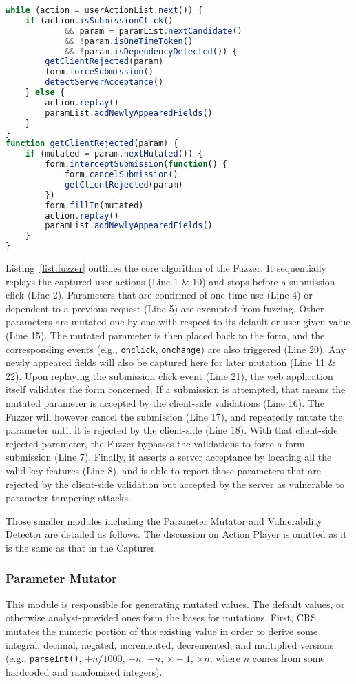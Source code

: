 \documentclass[letter]{sig-alternate-2013}
\begin{document}
\begin{lstlisting}[float=left,xleftmargin=2em,language=JavaScript,label=list:fuzzer,caption=The core algorithm of the Fuzzer]
while (action = userActionList.next()) {
	if (action.isSubmissionClick() 
			&& param = paramList.nextCandidate() 
			&& !param.isOneTimeToken() 
			&& !param.isDependencyDetected()) {
		getClientRejected(param)
		form.forceSubmission()
		detectServerAcceptance()
	} else {
		action.replay()
		paramList.addNewlyAppearedFields()
	}
}
function getClientRejected(param) {
	if (mutated = param.nextMutated()) {
		form.interceptSubmission(function() {
			form.cancelSubmission()
			getClientRejected(param)
		})
		form.fillIn(mutated)
		action.replay()
		paramList.addNewlyAppearedFields()
	}
}
\end{lstlisting}

Listing~\ref{list:fuzzer} outlines the core algorithm of the Fuzzer. It sequentially replays the captured user actions (Line 1 \& 10) and stops before a submission click (Line 2). Parameters that are confirmed of one-time use (Line 4) or dependent to a previous request (Line 5) are exempted from fuzzing. Other parameters are mutated one by one with respect to its default or user-given value (Line 15). The mutated parameter is then placed back to the form, and the corresponding events (e.g., \verb"onclick", \verb"onchange") are also triggered (Line 20). Any newly appeared fields will also be captured here for later mutation (Line 11 \& 22). Upon replaying the submission click event (Line 21), the web application itself validates the form concerned. If a submission is attempted, that means the mutated parameter is accepted by the client-side validations (Line 16). The Fuzzer will however cancel the submission (Line 17), and repeatedly mutate the parameter until it is rejected by the client-side (Line 18). With that client-side rejected parameter, the Fuzzer bypasses the validations to force a form submission (Line 7). Finally, it asserts a server acceptance by locating all the valid key features (Line 8), and is able to report those parameters that are rejected by the client-side validation but accepted by the server as vulnerable to parameter tampering attacks.

Those smaller modules including the Parameter Mutator and Vulnerability Detector are detailed as follows. The discussion on Action Player is omitted as it is the same as that in the Capturer.

\subsubsection{Parameter Mutator}
This module is responsible for generating mutated values. The default values, or otherwise analyst-provided ones form the bases for mutations. First, CRS mutates the numeric portion of this existing value in order to derive some integral, decimal, negated, incremented, decremented, and multiplied versions (e.g., \verb"parseInt()", $+n/1000$, $-n$, $+n$, $\times -1$, $\times n$, where $n$ comes from some hardcoded and randomized integers). 
\end{document}
